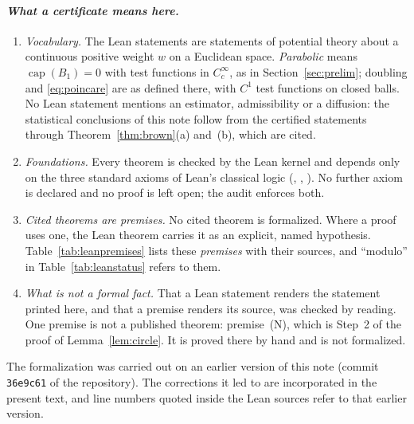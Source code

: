 \documentclass[11pt]{amsart}
\DeclareMathOperator{\capa}{cap}
\theoremstyle{plain}
\theoremstyle{definition}
\theoremstyle{remark}
\begin{document}
\paragraph{\textit{What a certificate means here.}}
\begin{enumerate}[label=\textup{(\arabic*)},leftmargin=2em,itemsep=2pt]
\item \emph{Vocabulary.} The Lean statements are statements of potential
theory about a continuous positive weight $w$ on a Euclidean space.
\emph{Parabolic} means $\capa(B_1)=0$ with test functions in $C_c^\infty$, as
in Section~\ref{sec:prelim}; doubling and \eqref{eq:poincare} are as defined
there, with $C^1$ test functions on closed balls. No Lean statement mentions
an estimator, admissibility or a diffusion: the statistical conclusions of
this note follow from the certified statements through
Theorem~\ref{thm:brown}(a) and~(b), which are cited.
\item \emph{Foundations.} Every theorem is checked by the Lean kernel and
depends only on the three standard axioms of Lean's classical logic
(, , ). No further
axiom is declared and no proof is left open; the audit enforces both.
\item \emph{Cited theorems are premises.} No cited theorem is formalized.
Where a proof uses one, the Lean theorem carries it as an explicit, named
hypothesis. Table~\ref{tab:leanpremises} lists these \emph{premises} with
their sources, and ``modulo'' in Table~\ref{tab:leanstatus} refers to them.
\item \emph{What is not a formal fact.} That a Lean statement renders the
statement printed here, and that a premise renders its source, was checked
by reading. One premise is not a published theorem: premise~(N), which is
Step~2 of the proof of Lemma~\ref{lem:circle}. It is proved there by hand and
is not formalized.
\end{enumerate}
The formalization was carried out on an earlier version of this note (commit
\texttt{36e9c61} of the repository). The corrections it led to are
incorporated in the present text, and line numbers quoted inside the Lean
sources refer to that earlier version.
\end{document}
